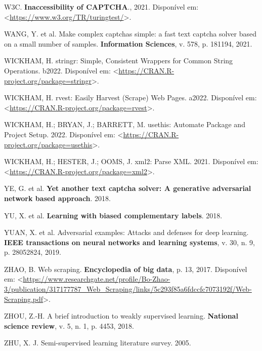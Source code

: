 \documentclass[12pt,twoside,brazilian]{book}
\newlength{\cslhangindent}
\newlength{\cslentryspacingunit} %
\newenvironment{CSLReferences}[2] %
 {%
  \setlength{\parindent}{0pt}
  \ifodd #1
  \let\oldpar\par
  \def\par{\hangindent=\cslhangindent\oldpar}
  \fi
  \setlength{\parskip}{#2\cslentryspacingunit}
 }%
 {}
\begin{document}
\begin{CSLReferences}{0}{1}
\leavevmode{}%
W3C. \textbf{Inaccessibility of CAPTCHA}., 2021. Disponível em:
\textless{}\url{https://www.w3.org/TR/turingtest/}\textgreater.

\leavevmode{}%
WANG, Y. et al. Make complex captchas simple: a fast text captcha solver
based on a small number of samples. \textbf{Information Sciences}, v.
578, p. 181194, 2021.

\leavevmode{}%
WICKHAM, H. stringr: Simple, Consistent Wrappers for Common String
Operations. b2022. Disponível em:
\textless{}\url{https://CRAN.R-project.org/package=stringr}\textgreater.

\leavevmode{}%
WICKHAM, H. rvest: Easily Harvest (Scrape) Web Pages. a2022. Disponível
em:
\textless{}\url{https://CRAN.R-project.org/package=rvest}\textgreater.

\leavevmode{}%
WICKHAM, H.; BRYAN, J.; BARRETT, M. usethis: Automate Package and
Project Setup. 2022. Disponível em:
\textless{}\url{https://CRAN.R-project.org/package=usethis}\textgreater.

\leavevmode{}%
WICKHAM, H.; HESTER, J.; OOMS, J. xml2: Parse XML. 2021. Disponível em:
\textless{}\url{https://CRAN.R-project.org/package=xml2}\textgreater.

\leavevmode{}%
YE, G. et al. \textbf{Yet another text captcha solver: A generative
adversarial network based approach}. 2018.

\leavevmode{}%
YU, X. et al. \textbf{Learning with biased complementary labels}. 2018.

\leavevmode{}%
YUAN, X. et al. Adversarial examples: Attacks and defenses for deep
learning. \textbf{IEEE transactions on neural networks and learning
systems}, v. 30, n. 9, p. 28052824, 2019.

\leavevmode{}%
ZHAO, B. Web scraping. \textbf{Encyclopedia of big data}, p. 13, 2017.
Disponível em:
\textless{}\url{https://www.researchgate.net/profile/Bo-Zhao-3/publication/317177787_Web_Scraping/links/5c293f85a6fdccfc7073192f/Web-Scraping.pdf}\textgreater.

\leavevmode{}%
ZHOU, Z.-H. A brief introduction to weakly supervised learning.
\textbf{National science review}, v. 5, n. 1, p. 4453, 2018.

\leavevmode{}%
ZHU, X. J. Semi-supervised learning literature survey. 2005.

\end{CSLReferences}
\end{document}
